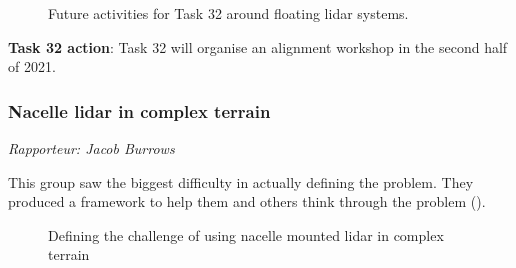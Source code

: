 \begin{figure}[p]
    \centering
    \caption{Future activities for Task 32 around floating lidar systems.}
    \label{fig:day3-floating-lidar}
\end{figure}

\textbf{Task 32 action}: Task 32 will organise an alignment workshop in
the second half of 2021.

\subsubsection{Nacelle lidar in complex terrain}
\emph{Rapporteur: Jacob Burrows}

This group saw the biggest difficulty in actually defining the problem. They produced a framework to help them and others think through the problem ().

\begin{figure}[p]
    \centering
    \caption{Defining the challenge of using nacelle mounted lidar in complex terrain}
    \label{fig:day3-nacelle-mounted}
\end{figure}

